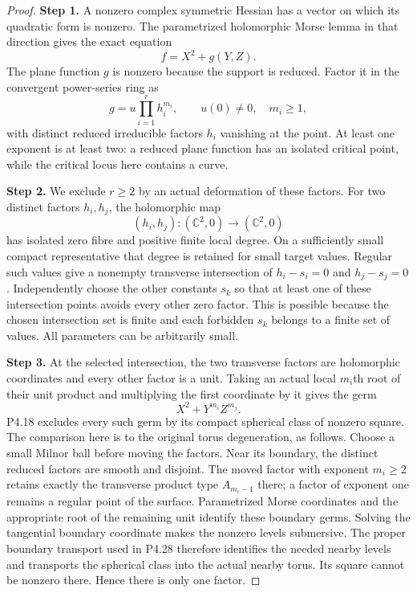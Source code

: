 \begin{proof}
\noindent\textbf{Step 1.} A nonzero complex symmetric Hessian has a vector on which its
quadratic form is nonzero. The parametrized holomorphic Morse
lemma in that direction gives the exact equation
\[
                        f=X^2+g(Y,Z).
\]
The plane function $g$ is nonzero because the support is
reduced. Factor it in the convergent power-series ring as
\[
             g=u\prod_{i=1}^{r}h_i^{m_i},
             \qquad u(0)\ne0,\quad m_i\ge1,
\]
with distinct reduced irreducible factors $h_i$ vanishing at
the point. At least one exponent is at least two: a reduced
plane function has an isolated critical point, while the
critical locus here contains a curve.

\noindent\textbf{Step 2.} We exclude $r\ge2$ by an actual deformation of these factors.
For two distinct factors $h_i,h_j$, the holomorphic map
\[
 (h_i,h_j):(\mathbb C^2,0)\longrightarrow(\mathbb C^2,0)
\]
has isolated zero fibre and positive finite local degree.
On a sufficiently small compact representative that degree
is retained for small target values. Regular such values
give a nonempty transverse intersection of
$h_i-s_i=0$ and $h_j-s_j=0$. Independently choose the
other constants $s_k$ so that at least one of these
intersection points avoids every other zero factor. This
is possible because the chosen intersection set is finite
and each forbidden $s_k$ belongs to a finite set of values.
All parameters can be arbitrarily small.

\noindent\textbf{Step 3.} At the selected intersection, the two transverse factors
are holomorphic coordinates and every other factor is a
unit. Taking an actual local $m_i$th root of their unit
product and multiplying the first coordinate by it gives
the germ
\[
                        X^2+Y^{m_i}Z^{m_j}.
\]
P4.18 excludes every such germ by its compact spherical
class of nonzero square. The comparison here is to the
original torus degeneration, as follows. Choose a small
Milnor ball before moving the factors. Near its boundary,
the distinct reduced factors are smooth and disjoint.
The moved factor with exponent $m_i\ge2$ retains exactly
the transverse product type $A_{m_i-1}$ there; a factor
of exponent one remains a regular point of the surface.
Parametrized Morse coordinates and the appropriate root
of the remaining unit identify these boundary germs.
Solving the tangential boundary coordinate makes the
nonzero levels submersive. The proper boundary transport
used in P4.28 therefore identifies the needed nearby
levels and transports the spherical class into the actual
nearby torus. Its square cannot be nonzero there. Hence
there is only one factor.


\end{proof}
